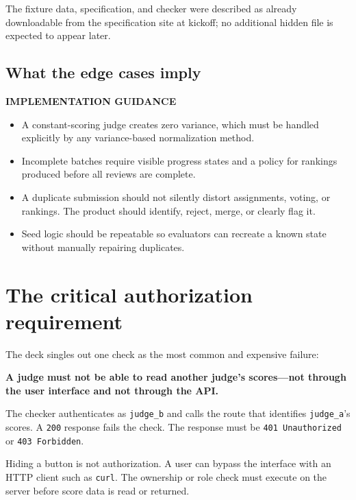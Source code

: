 \documentclass[11pt]{article}
\newcommand{\advisory}{\textcolor{DeepBlue}{\textbf{IMPLEMENTATION GUIDANCE}}}
\begin{document}
The fixture data, specification, and checker were described as already downloadable from the specification site at kickoff; no additional hidden file is expected to appear later.

\subsection{What the edge cases imply}

\advisory\par


\begin{itemize}
  \item A constant-scoring judge creates zero variance, which must be handled explicitly by any variance-based normalization method.
  \item Incomplete batches require visible progress states and a policy for rankings produced before all reviews are complete.
  \item A duplicate submission should not silently distort assignments, voting, or rankings. The product should identify, reject, merge, or clearly flag it.
  \item Seed logic should be repeatable so evaluators can recreate a known state without manually repairing duplicates.
\end{itemize}

\section{The critical authorization requirement}

The deck singles out one check as the most common and expensive failure:

\begin{keybox}
\textbf{A judge must not be able to read another judge's scores---not through the user interface and not through the API.}
\end{keybox}

The checker authenticates as \texttt{judge\_b} and calls the route that identifies \texttt{judge\_a}'s scores. A \texttt{200} response fails the check. The response must be \texttt{401 Unauthorized} or \texttt{403 Forbidden}.

Hiding a button is not authorization. A user can bypass the interface with an HTTP client such as \texttt{curl}. The ownership or role check must execute on the server before score data is read or returned.
\end{document}
